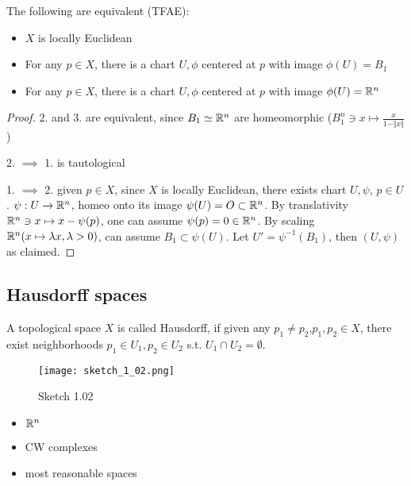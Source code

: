 \begin{lemma}\label{lem:1.1}
    The following are equivalent (TFAE):
    \begin{itemize}
        \item \(X\) is locally Euclidean
        \item For any \(p\in X\), there is a chart \(U,\phi\) centered at \(p\) with image \(\phi(U)=B_1\)
        \item For any \(p\in X\), there is a chart \(U,\phi\) centered at \(p\) with image \(\phi(U)=\mathbb{R}^n\)
    \end{itemize}
\end{lemma}

\begin{proof}
    2. and 3. are equivalent, since \(B_1 \simeq \mathbb{R}^n\) are homeomorphic (\(B_1^n\ni x\mapsto \frac{x}{1-\Vert x\Vert}\))
    
    2. \(\implies \) 1. is tautological

    1. \(\implies\) 2. given \(p\in X\), since \(X\) is locally Euclidean, there exists  chart \(U,\psi\), \(p\in U\).
    \(\psi:U\to\mathbb{R}^n\), homeo onto its image \(\psi(U)=O\subset\mathbb{R}^n\). By translativity \(\mathbb{R}^n\ni x\mapsto x-\psi(p)\), one can assume 
    \(\psi(p)=0\in\mathbb{R}^n\). By scaling \(\mathbb{R}^n (x\mapsto \lambda x,\lambda>0)\), can assume \(B_1\subset\psi(U)\).
    Let \(U'=\psi^{-1}(B_1)\), then \((U,\psi)\) as claimed. 
\end{proof}

\subsection{Hausdorff spaces}

\begin{definition*}
    A topological space \(X\) is called Hausdorff, if given any \(p_1\neq p_2\),\(p_1,p_2\in X\), there exist neighborhoods \(p_1\in U_1,p_2\in U_2\) s.t. \(U_1\cap U_2=\emptyset\).
  \begin{figure}[H]
        \centering
        \texttt{[image: sketch\_1\_02.png]}
        \caption{Sketch 1.02}
    \end{figure}
\end{definition*}

\begin{example}
    \begin{itemize}
        \item \(\mathbb{R}^n\)
        \item CW complexes
        \item most reasonable spaces
    \end{itemize}
\end{example}

